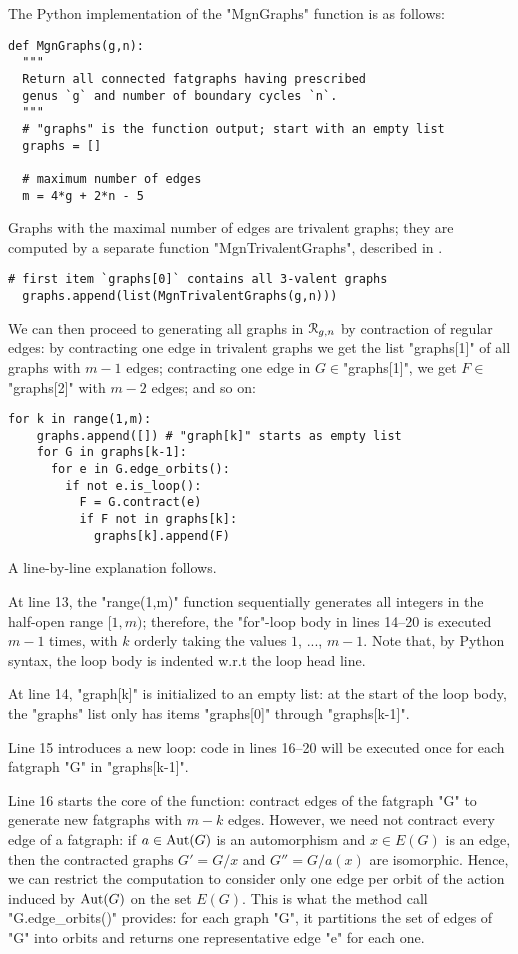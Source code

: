 The Python implementation of the "MgnGraphs" function is as follows:
\begin{lstlisting}[name=MgnGraphs,firstnumber=1]
def MgnGraphs(g,n):
  """
  Return all connected fatgraphs having prescribed
  genus `g` and number of boundary cycles `n`.
  """
  # "graphs" is the function output; start with an empty list
  graphs = []

  # maximum number of edges
  m = 4*g + 2*n - 5
\end{lstlisting}
Graphs with the maximal number of edges are trivalent graphs; they are
computed by a separate function "MgnTrivalentGraphs", described in
.
\begin{lstlisting}[name=MgnGraphs,firstnumber=11]
  # first item `graphs[0]` contains all 3-valent graphs
  graphs.append(list(MgnTrivalentGraphs(g,n)))
\end{lstlisting}
We can then proceed to generating all graphs in $\mathcal{R}_{g,n}$ by
contraction of regular edges: by contracting one edge in
trivalent graphs we get the list "graphs[1]" of all graphs with
$m-1$ edges; contracting one edge in $G \in $"graphs[1]", we
get $F \in $"graphs[2]" with $m-2$ edges; and so on:
\begin{lstlisting}[name=MgnGraphs,firstnumber=13]
  for k in range(1,m):
    graphs.append([]) # "graph[k]" starts as empty list
    for G in graphs[k-1]:
      for e in G.edge_orbits():
        if not e.is_loop():
          F = G.contract(e)
          if F not in graphs[k]:
            graphs[k].append(F)
\end{lstlisting}
A line-by-line explanation follows.

At line 13, the "range(1,m)" function sequentially generates all
integers in the half-open range $[1, m)$; therefore, the "for"-loop
body in lines 14--20 is executed $m-1$ times, with $k$ orderly taking
the values $1$, ..., $m-1$.  Note that, by Python syntax, the loop
body is indented w.r.t the loop head line.

At line 14, "graph[k]" is initialized to an empty list: at the start
of the loop body, the "graphs" list only has items "graphs[0]"
through "graphs[k-1]".

Line 15 introduces a new loop: code in lines 16--20 will be executed
once for each fatgraph "G" in "graphs[k-1]".

Line 16 starts the core of the function: contract edges of the
fatgraph "G" to generate new fatgraphs with $m-k$ edges.  However,
we need not contract every edge of a fatgraph: if $a \in \operatorname{Aut}(G)$ is
an automorphism and $x \in E(G)$ is an edge, then the contracted
graphs $G' = G/x$ and $G'' = G/a(x)$ are isomorphic.  Hence, we can
restrict the computation to consider only one edge per orbit of the
action induced by $\operatorname{Aut}(G)$ on the set $E(G)$. This is what the method
call "G.edge_orbits()" provides: for each graph "G", it partitions
the set of edges of "G" into orbits and returns one representative
edge "e" for each one.

